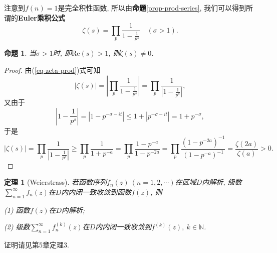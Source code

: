 \documentclass[12pt, a4paper, oneside]{ctexart}
\newtheorem{theorem}{定理}[section] %
\newtheorem{proposition}{命题}[section]
\numberwithin{equation}{section}  %
\let\leq=\leqslant %
\let\geq=\geqslant %
\def\N{\mathbb{N}}          %
\def\re{\mathrm{Re}}        %
\def\add{\vspace{1ex}}      %
\begin{document}
注意到$f(n) = 1$是完全积性函数, 所以由\textbf{命题}\ref{prop-prod-series}, 我们可以得到所谓的\textbf{Euler乘积公式}
\begin{equation}\label{eq-zeta-prod}
    \zeta(s) = \prod_p\frac{1}{1-\frac{1}{p^s}}\quad(\sigma > 1).
\end{equation}
\begin{proposition}\label{prop-zeta-zero1}
    当$\sigma > 1$时, 即$\re(s) > 1$, 则$\zeta(s)\neq 0$.
\end{proposition}
\begin{proof}
    由(\ref{eq-zeta-prod})式可知
    \begin{equation*}
        |\zeta(s)| = \left|\prod_p\frac{1}{1-\frac{1}{p^s}}\right|=\prod_p\frac{1}{\left|1-\frac{1}{p^s}\right|},
    \end{equation*}
    又由于
    \begin{equation*}
        \left|1-\frac{1}{p^s}\right| = |1-p^{-\sigma-i t}| \leq 1+|p^{-\sigma-it}| = 1+p^{-\sigma},
    \end{equation*}
    于是
    \begin{equation}\label{eq-zeta-zero1}
        |\zeta(s)|=\prod_p\frac{1}{\left|1-\frac{1}{p^s}\right|}\geq \prod_p\frac{1}{1+p^{-a}} = \prod_p\frac{1-p^{-a}}{1-p^{-2a}} = \prod_p\frac{(1-p^{-2a})^{-1}}{(1-p^{-a})^{-1}}=\frac{\zeta(2a)}{\zeta(a)} > 0.
    \end{equation}
\end{proof}
\begin{theorem}[Weierstrass]\label{thm-weierstrass}
    若函数序列$f_n(z)\ (n=1,2,\cdots)$在区域$D$内解析, 级数$\sum_{n=1}^\infty f_n(z)$在$D$内内闭一致收敛到函数$f(z)$, 则
    
    (1) 函数$f(z)$在$D$内解析;
    
    (2) 级数$\sum_{n=1}^\infty f_n^{(k)}(z)$在$D$内内闭一致收敛到$f^{(k)}(z),\ k\in\N$.
\end{theorem}
证明请见\cite{ref-复变函数}第5章定理3.\add
\end{document}
